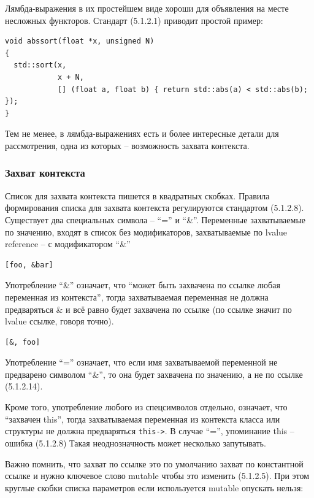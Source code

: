 \documentclass[a4paper,12pt,oneside]{article}
\begin{document}
Лямбда-выражения в их простейшем виде хороши для объявления на месте несложных функторов. Стандарт (5.1.2.1) приводит простой пример:

\begin{lstlisting}
void abssort(float *x, unsigned N)
{
  std::sort(x, 
            x + N,
            [] (float a, float b) { return std::abs(a) < std::abs(b); });
}
\end{lstlisting}

Тем не менее, в лямбда-выражениях есть и более интересные детали для рассмотрения, одна из которых -- возможность захвата контекста.

\subsubsection{Захват контекста}

Список для захвата контекста пишется в квадратных скобках. Правила формирования списка для захвата контекста регулируются стандартом (5.1.2.8). Существует два специальных символа -- ``='' и ``\&''. Переменные захватываемые по значению, входят в список без модификаторов, захватываемые по lvalue reference -- с модификатором ``\&''

\begin{lstlisting}
[foo, &bar]
\end{lstlisting}

Употребление ``\&'' означает, что ``может быть захвачена по ссылке любая переменная из контекста'', тогда захватываемая переменная не должна предваряться \& и всё равно будет захвачена по ссылке (по ссылке значит по lvalue ссылке, говоря точно).

\begin{lstlisting}
[&, foo]
\end{lstlisting}

Употребление ``='' означает, что если имя захватываемой переменной не предварено символом ``\&'', то она будет захвачена по значению, а не по ссылке (5.1.2.14). 

Кроме того, употребление любого из спецсимволов отдельно, означает, что ``захвачен this'', тогда захватываемая переменная из контекста класса или структуры не должна предваряться \lstinline!this->!. В случае ``='', упоминание this -- ошибка (5.1.2.8)  Такая неоднозначность может несколько запутывать.

Важно помнить, что захват по ссылке это по умолчанию захват по константной ссылке и нужно ключевое слово mutable чтобы это изменить (5.1.2.5). При этом круглые скобки списка параметров если используется mutable опускать нельзя:
\end{document}

